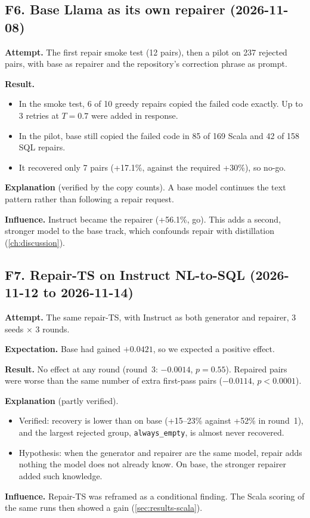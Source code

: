 \subsection{F6. Base Llama as its own repairer (2026-11-08)}\label{sec:fail-baserepair}
\begin{failbox}{}
\textbf{Attempt.} The first repair smoke test (12 pairs), then a pilot on 237 rejected pairs, with base as repairer
and the repository's correction phrase as prompt.

\textbf{Result.}
\begin{itemize}
\item In the smoke test, 6 of 10 greedy repairs copied the failed code exactly. Up to 3 retries at $T=0.7$ were added
in response.
\item In the pilot, base still copied the failed code in 85 of 169 Scala and 42 of 158 SQL repairs.
\item It recovered only 7 pairs (+17.1\%, against the required +30\%), so no-go.
\end{itemize}

\textbf{Explanation} (verified by the copy counts). A base model continues the text pattern rather than following a
repair request.

\textbf{Influence.} Instruct became the repairer (+56.1\%, go). This adds a second, stronger model to the base track,
which confounds repair with distillation (\cref{ch:discussion}).
\end{failbox}

\subsection{F7. Repair-TS on Instruct NL-to-SQL (2026-11-12 to 2026-11-14)}
\begin{failbox}{}
\textbf{Attempt.} The same repair-TS, with Instruct as both generator and repairer, 3 seeds $\times$ 3 rounds.

\textbf{Expectation.} Base had gained $+0.0421$, so we expected a positive effect.

\textbf{Result.} No effect at any round (round~3: $-0.0014$, $p=0.55$). Repaired pairs were worse than the same number
of extra first-pass pairs ($-0.0114$, $p<0.0001$).

\textbf{Explanation} (partly verified).
\begin{itemize}
\item Verified: recovery is lower than on base (+15--23\% against +52\% in round~1), and the largest rejected group,
\texttt{always\_empty}, is almost never recovered.
\item Hypothesis: when the generator and repairer are the same model, repair adds nothing the model does not already
know. On base, the stronger repairer added such knowledge.
\end{itemize}

\textbf{Influence.} Repair-TS was reframed as a conditional finding. The Scala scoring of the same runs then showed a
gain (\cref{sec:results-scala}).
\end{failbox}

